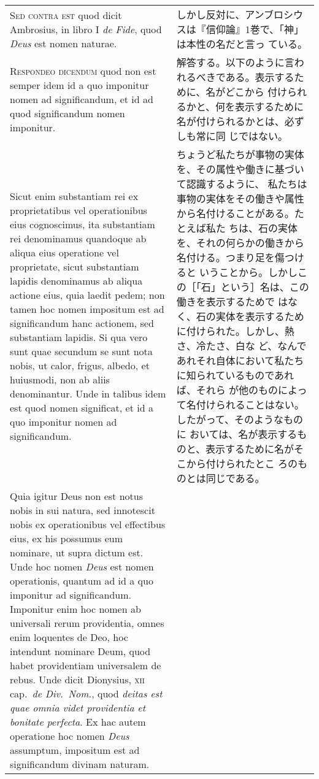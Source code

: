 \documentclass[paper=a4paper,fontsize=10pt,jafontsize=9pt,titlepage]{jlreq}
\begin{document}
\begin{longtable}{p{21em}p{21em}}
{\scshape Sed contra est} quod dicit Ambrosius, in libro I {\itshape
de Fide}, quod {\itshape Deus} est nomen naturae.

&

しかし反対に、アンブロシウスは『信仰論』1巻で、「神」は本性の名だと言っ
ている。

\\

{\scshape Respondeo dicendum} quod non est semper idem id a quo
imponitur nomen ad significandum, et id ad quod significandum nomen
imponitur.

&

解答する。以下のように言われるべきである。表示するために、名がどこから
付けられるかと、何を表示するために名が付けられるかとは、必ずしも常に同
じではない。

\\

Sicut enim substantiam rei ex proprietatibus vel operationibus eius
cognoscimus, ita substantiam rei denominamus quandoque ab aliqua eius
operatione vel proprietate, sicut substantiam lapidis denominamus ab
aliqua actione eius, quia laedit pedem; non tamen hoc nomen impositum
est ad significandum hanc actionem, sed substantiam lapidis. Si qua
vero sunt quae secundum se sunt nota nobis, ut calor, frigus, albedo,
et huiusmodi, non ab aliis denominantur. Unde in talibus idem est quod
nomen significat, et id a quo imponitur nomen ad significandum.

&

ちょうど私たちが事物の実体を、その属性や働きに基づいて認識するように、
私たちは事物の実体をその働きや属性から名付けることがある。たとえば私た
ちは、石の実体を、それの何らかの働きから名付ける。つまり足を傷つけると
いうことから。しかしこの［「石」という］名は、この働きを表示するためで
はなく、石の実体を表示するために付けられた。しかし、熱さ、冷たさ、白な
ど、なんであれそれ自体において私たちに知られているものであれば、それら
が他のものによって名付けられることはない。したがって、そのようなものに
おいては、名が表示するものと、表示するために名がそこから付けられたとこ
ろのものとは同じである。

\\

Quia igitur Deus non est notus nobis in sui natura, sed innotescit
nobis ex operationibus vel effectibus eius, ex his possumus eum
nominare, ut supra dictum est. Unde hoc nomen {\itshape Deus} est
nomen operationis, quantum ad id a quo imponitur ad
significandum. Imponitur enim hoc nomen ab universali rerum
providentia, omnes enim loquentes de Deo, hoc intendunt nominare Deum,
quod habet providentiam universalem de rebus. Unde dicit Dionysius,
{\scshape xii} cap.~{\itshape de Div.~Nom.}, quod {\itshape deitas est
quae omnia videt providentia et bonitate perfecta}. Ex hac autem
operatione hoc nomen {\itshape Deus} assumptum, impositum est ad
significandum divinam naturam.


\end{longtable}
\end{document}
